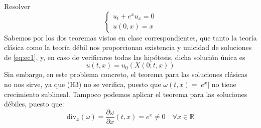 \documentclass[12pt]{article}
\newcommand{\R}{\mathbb{R}}
\newcommand{\di}{\text{div}}
\begin{document}
    \newpage

    \begin{ejercicio}
        Resolver 
        \begin{equation}\label{eq:ec1}
            \begin{cases}
                u_t + e^x u_x = 0 \\
                u(0,x) = x
            \end{cases}
        \end{equation}
        Sabemos por los dos teoremas vistos en clase correspondientes, que tanto la teoría clásica como la teoría débil nos proporcionan existencia y unicidad de soluciones de \eqref{eq:ec1}, y, en caso de verificarse todas las hipótesis, dicha solución única es
        $$u(t,x) = u_0(X(0;t,x))$$
        Sin embargo, en este problema concreto, el teorema para las soluciones clásicas no nos sirve, ya que (H3) no se verifica, puesto que $\omega(t,x) = |e^x|$ no tiene crecimiento sublineal.
        Tampoco podemos aplicar el teorema para las soluciones débiles, puesto que:
        $$\di_x(\omega) = \dfrac{\partial \omega}{\partial x}(t,x) = e^x \neq 0 \quad \forall x \in \R$$

\end{ejercicio}
\end{document}
